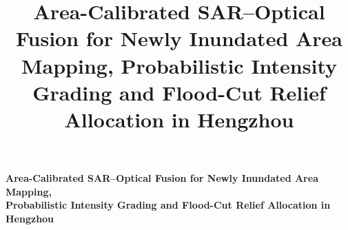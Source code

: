 \documentclass[bwprint]{apmcmthesis}
\title{Area-Calibrated SAR--Optical Fusion for Newly Inundated Area Mapping, Probabilistic Intensity Grading and Flood-Cut Relief Allocation in Hengzhou}
\begin{document}
\frenchspacing

\renewcommand{\thepage}{\ifnum\value{page}>2 \the\numexpr\value{page}-2\relax\else\roman{page}\fi}

\pagestyle{frontmatterstyle}
\thispagestyle{frontmatterstyle}

\begin{center}
\parbox{0.92\textwidth}{\centering\large\bfseries
Area-Calibrated SAR--Optical Fusion for Newly Inundated Area Mapping,\\[2pt]
Probabilistic Intensity Grading and Flood-Cut Relief Allocation in Hengzhou\par}
\end{center}
\end{document}
